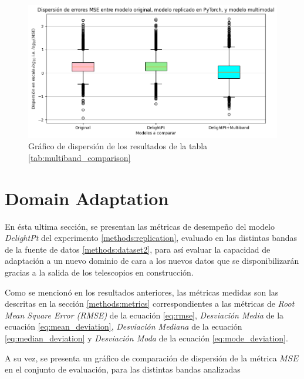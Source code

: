 \documentclass[../tesis.tex]{subfiles}
\begin{document}
\begin{figure}[!ht]
    \centering
    \includegraphics[width=0.8\linewidth]{images//results/delightpt+multiband_dispersion.png}
    \caption{Gráfico de dispersión de los resultados de la tabla \ref{tab:multiband_comparison}}
    \label{fig:graph-multiband}
\end{figure}

\section{Domain Adaptation} \label{results:transfer-learning}
En ésta ultima sección, se presentan las métricas de desempeño del modelo \textit{DelightPt} del experimento \ref{methods:replication}, evaluado en las distintas bandas de la fuente de datos \ref{methods:dataset2}, para así evaluar la capacidad de adaptación a un nuevo dominio de cara a los nuevos datos que se disponibilizarán gracias a la salida de los telescopios en construcción.\par\null\par

Como se mencionó en los resultados anteriores, las métricas medidas son las descritas en la sección \ref{methods:metrics} correspondientes a las métricas de \textit{Root Mean Square Error (RMSE)} de la ecuación \ref{eq:rmse}, \textit{Desviación Media} de la ecuación \ref{eq:mean_deviation}, \textit{Desviación Mediana} de la ecuación \ref{eq:median_deviation} y \textit{Desviación Moda} de la ecuación \ref{eq:mode_deviation}.\par\null\par

A su vez, se presenta un gráfico de comparación de dispersión de la métrica $MSE$ en el conjunto de evaluación, para las distintas bandas analizadas\par\null\par

\end{document}
